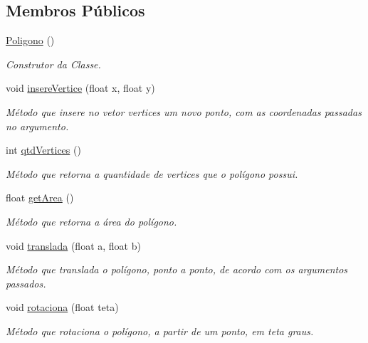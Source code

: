 \subsection*{Membros Públicos}
\begin{DoxyCompactItemize}
\item 
\mbox{\label{classPoligono_a9311a9a1496878c09c8508b3636e2870}} 
\mbox{\hyperlink{classPoligono_a9311a9a1496878c09c8508b3636e2870}{Poligono}} ()
\begin{DoxyCompactList}\small\item\em Construtor da Classe. \end{DoxyCompactList}\item 
void \mbox{\hyperlink{classPoligono_aeaad76667207d96ea0d69c2dfb3bc2a9}{insere\+Vertice}} (float x, float y)
\begin{DoxyCompactList}\small\item\em Método que insere no vetor \textquotesingle{}vertices\textquotesingle{} um novo ponto, com as coordenadas passadas no argumento. \end{DoxyCompactList}\item 
int \mbox{\hyperlink{classPoligono_ae2c1c915b4a72104724d1302138e7caa}{qtd\+Vertices}} ()
\begin{DoxyCompactList}\small\item\em Método que retorna a quantidade de vertices que o polígono possui. \end{DoxyCompactList}\item 
float \mbox{\hyperlink{classPoligono_ab1a85a090e7442bf3151602b05da9e19}{get\+Area}} ()
\begin{DoxyCompactList}\small\item\em Método que retorna a área do polígono. \end{DoxyCompactList}\item 
void \mbox{\hyperlink{classPoligono_adbf605dfd0419b7301c9be0ec1dbe41b}{translada}} (float a, float b)
\begin{DoxyCompactList}\small\item\em Método que translada o polígono, ponto a ponto, de acordo com os argumentos passados. \end{DoxyCompactList}\item 
void \mbox{\hyperlink{classPoligono_a937c0e2bec60140fcc7b7bde5d64d339}{rotaciona}} (float teta)
\begin{DoxyCompactList}\small\item\em Método que rotaciona o polígono, a partir de um ponto, em teta graus. \end{DoxyCompactList}\item 

\end{DoxyCompactItemize}
